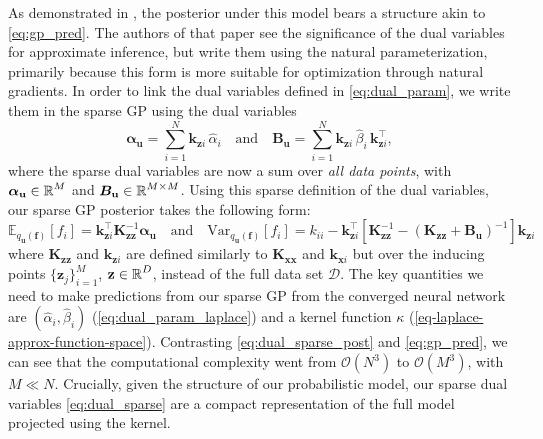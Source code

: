 \documentclass{article}
\newcommand{\dataset}{\ensuremath{\mathcal{D}}}
\newcommand{\mathbold}[1]{\bm{#1}}
\newcommand{\mbf}[1]{\mathbf{#1}}
\newcommand{\T}{\top}
\newcommand{\valpha}[0]{\mathbold{\alpha}}
\newcommand{\MBeta}[0]{\mathbold{B}}
\newcommand{\vz}{\mbf{z}}
\newcommand{\vf}{\mbf{f}}
\newcommand{\vu}{\mbf{u}}
\newcommand{\vx}{\mbf{x}}
\newcommand{\MKzz}{\mbf{K}_{\mbf{z}\mbf{z}}}
\newcommand{\MKxx}{\mbf{K}_{\mbf{x}\mbf{x}}}
\newcommand{\vkzi}{\mbf{k}_{\mbf{z}i}}
\newcommand{\vkzs}{\mbf{k}_{\mbf{z}i}}
\newcommand{\vk}{\mbf{k}}
\newcommand{\myexpect}{\mathbb{E}}
\begin{document}
As demonstrated in \cite{adam2021dual}, the posterior under this model bears a structure akin to \cref{eq:gp_pred}. The authors of that paper  see the significance of the dual variables for approximate inference, but write them using the natural parameterization, primarily because this form is more suitable for optimization through natural gradients. In order to link the dual variables defined in \cref{eq:dual_param}, we write them in the sparse GP using the dual variables
%
\begin{equation} \textstyle
  \valpha_{\vu}  =  \sum_{i=1}^N  \vkzi \, \hat{\alpha}_{i}
  \quad \text{and} \quad
  \MBeta_{\vu} =  \sum_{i=1}^N \vkzi \,\hat{\beta}_{i} \, \vkzi^{\T} ,    
\label{eq:dual_sparse}
\end{equation}
%
where the sparse dual variables are now a sum over \emph{all data points}, with $\valpha_{\vu} \in \R^{M}$ and $\MBeta_{\vu} \in \R^{M  \times M}$. Using this sparse definition of the dual variables, our sparse GP posterior takes the following form:
\begin{equation}\label{eq:dual_sparse_post}
   \myexpect_{q_{\vu}(\vf)}[f_i] = \vkzs^{\T} \MKzz^{-1} \valpha_{\vu}
   \quad \text{and} \quad 
   \textrm{Var}_{q_{\vu}(\vf)}[f_i]  = k_{ii} - \vkzs^\top [\MKzz^{-1} - (\MKzz + \MBeta_{\vu})^{-1} ]\vkzs
\end{equation}
where $\MKzz$ and $\vkzs$ are defined similarly to $\MKxx$ and $\vk_{\vx i}$ but over the inducing points $\{\vz_j\}_{i=1}^M$, $\vz \in \R^{D}$, instead of the full data set $\dataset$. The key quantities we need to make predictions from our sparse GP from the converged neural network are $(\hat{\alpha}_i, \hat{\beta}_i)$ (\cref{eq:dual_param_laplace}) and a kernel function $\kappa$ (\cref{eq-laplace-approx-function-space}). Contrasting \cref{eq:dual_sparse_post} and \cref{eq:gp_pred}, we can see that the computational complexity went from $\mathcal{O}(N^3)$ to $\mathcal{O}(M^3)$, with $M \ll N$.  Crucially, given the structure of our probabilistic model, our sparse dual variables \cref{eq:dual_sparse} are a compact representation of the full model projected using the kernel. 
\end{document}
